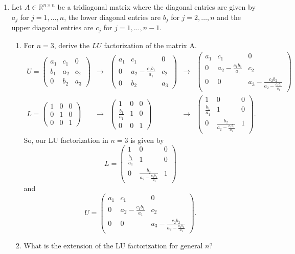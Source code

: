 \documentclass[a4paper,12pt]{article}
\newcommand{\reals}{\mathbb{R}}
\newcommand{\pmat}[1]{\begin{pmatrix} #1 \end{pmatrix}}
\begin{document}
\begin{enumerate}[label = \arabic*.]
	\item Let $ A \in \reals^{n \times n} $ be a tridiagonal matrix where the diagonal entries are given by $ a_j $ for $ j = 1, \ldots, n $, the lower diagonal entries are $ b_j $ for $ j = 2, \ldots, n $ and the upper diagonal entries are $ c_j $ for $ j = 1, \ldots, n-1 $.
	\begin{enumerate}[label = (\alph*)]
		\item For $ n = 3 $, derive the $ LU $ factorization of the matrix A.
		\[
			\begin{array}{ccccc}
				U = \pmat{a_1 & c_1 & 0 \\ b_1 & a_2 & c_2 \\ 0 & b_2 & a_3} & \to & \pmat{a_1 & c_1 & 0 \\ 0 & a_2 - \frac{c_1 b_1}{a_1} & c_2 \\ 0 & b_2 & a_3} & \to & \pmat{a_1 & c_1 & 0 \\ 0 & a_2 - \frac{c_1 b_1}{a_1} & c_2 \\ 0 & 0 & a_3 - \frac{c_2 b_2}{a_2 - \frac{c_1 b_1}{a_1}}} \\
				L = \pmat{1 & 0 & 0 \\ 0 & 1 & 0 \\ 0 & 0 & 1} & \to & \pmat{1 & 0 & 0 \\ \frac{b_1}{a_1} & 1 & 0 \\ 0 & 0 & 1} & \to & \pmat{1 & 0 & 0 \\ \frac{b_1}{a_1} & 1 & 0 \\ 0 & \frac{b_2}{a_2 - \frac{c_1 b_1}{a_1}} & 1}.
			\end{array}
		\]
		So, our LU factorization in $ n = 3 $ is given by 
		\[
			L = \pmat{1 & 0 & 0 \\ \frac{b_1}{a_1} & 1 & 0 \\ 0 & \frac{b_2}{a_2 - \frac{c_1 b_1}{a_1}} & 1}
		\]
		and
		\[
			U = \pmat{a_1 & c_1 & 0 \\ 0 & a_2 - \frac{c_1 b_1}{a_1} & c_2 \\ 0 & 0 & a_3 - \frac{c_2 b_2}{a_2 - \frac{c_1 b_1}{a_1}}}.
		\]
		
		\item What is the extension of the LU factorization for general $ n $?
		

\end{enumerate}
\end{enumerate}
\end{document}

